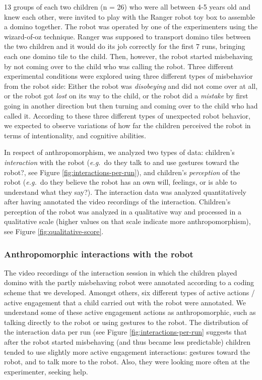 \documentclass{frontiersSCNS} %
\newcommand{\eg}{{\textit{e.g.~}}}
\begin{document}
13 groups of each two children (n = 26) who were all between 4-5 years old and
knew each other, were invited to play with the Ranger
robot toy box \citep{fink2014which} to assemble a domino together. The robot
was operated by one of the experimenters using the wizard-of-oz technique.
Ranger was supposed to transport domino tiles between the two children and it
would do its job correctly for the first 7 runs, bringing each one domino tile to the child. Then, however, the
robot started misbehaving by not coming over to the child who was calling the 
robot. Three different experimental conditions were explored using three different 
types of misbehavior from the robot side:
Either the robot was \textit{disobeying} and did not come over at all, or 
the robot got \textit{lost} on its way to the child, or the robot did a 
\textit{mistake} by first going in another direction but then turning and 
coming over to the child who had called it.
According to these three different types of unexpected robot behavior, we 
expected to observe variations of how far the children perceived the 
robot in terms of intentionality, and cognitive abilities.

In respect of anthropomorphism, we analyzed two types of data: children's 
\textit{interaction} with the robot (\eg do they talk to and use gestures 
toward the robot?, see Figure \ref{fig:interactions-per-run}), and 
children's \textit{perception} of the robot (\eg do they believe the 
robot has an own will, feelings, or is able to understand what they 
say?). The interaction data was analyzed quantitatively after having 
annotated the video recordings of the interaction. Children's perception 
of the robot was analyzed in a qualitative way and processed in a 
qualitative scale (higher values on that scale indicate more 
anthropomorphism), see Figure \ref{fig:qualitative-score}.


\subsubsection{Anthropomorphic interactions with the robot\\}

The video recordings of the interaction session in which the children 
played domino with the partly misbehaving robot were annotated according 
to a coding scheme that we developed. Amongst others, six different types 
of active actions / active engagement that a child carried out with the 
robot were annotated. We understand some of these active engagement 
actions as anthropomorphic, such as talking directly to the robot or 
using gestures to the robot. The distribution of the interaction data per 
run (see Figure \ref{fig:interactions-per-run} suggests that after the 
robot started misbehaving (and thus became less predictable) children 
tended to use slightly more active engagement interactions: gestures toward the 
robot, and to talk more to the robot. Also, they were looking more often at the 
experimenter, seeking help. 
\end{document}
